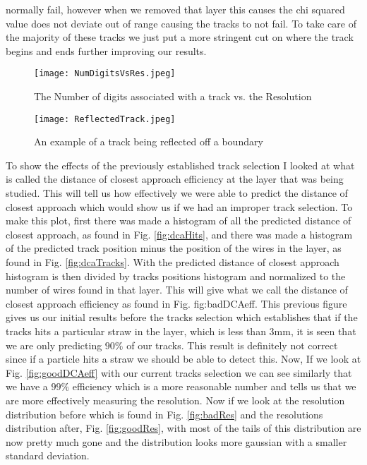\documentclass[./Thesis]{subfiles}
\begin{document}
normally fail, however when we removed that layer this causes the chi squared value does not deviate out of range causing the tracks to not fail. To take care of the majority of these tracks we just put a more stringent cut on where the track begins and ends further improving our results.
	
\begin{figure}
	\centerline{\texttt{[image: NumDigitsVsRes.jpeg]}}
	\caption[Number of Digits vs. Resolution]{ The Number of digits associated with a track vs. the Resolution}
	\label{fig:NumDigits}
\end{figure} 

\begin{figure}
	\centerline{\texttt{[image: ReflectedTrack.jpeg]}}
	\caption[Reflected Track]{ An example of a track being reflected off a boundary}
	\label{fig:RefTrack}
\end{figure} 

	 
	 
	 To show the effects of the previously established track selection I looked at what is called the distance of closest approach efficiency at the layer that was being studied. This will tell us how effectively we were able to predict the distance of closest approach which would show us if we had an improper track selection. To make this plot, first there was made a histogram of all the predicted distance of closest approach, as found in Fig. \ref{fig:dcaHits}, and there was made a histogram of the predicted track position minus the position of the wires in the layer, as found in Fig. \ref{fig:dcaTracks}. With the predicted distance of closest approach histogram is then divided by tracks positions histogram and normalized to the number of wires found in that layer. This will give what we call the distance of closest approach efficiency as found in Fig. {fig:badDCAeff}. This previous figure gives us our initial results before the tracks selection which establishes that if the tracks hits a particular straw in the layer, which is less than 3mm, it is seen that we are only predicting $90\%$  of our tracks. This result is definitely not correct since if a particle hits a straw we should be able to detect this. Now, If we look at Fig. \ref{fig:goodDCAeff} with our current tracks selection we can see similarly that we have a $99\%$ efficiency which is a more reasonable number and tells us that we are more effectively measuring the resolution. Now if we look at the resolution distribution before which is found in Fig. \ref{fig:badRes} and the resolutions distribution after, Fig. \ref{fig:goodRes}, with most of the tails of this distribution are now pretty much gone and the distribution looks more gaussian with a smaller standard deviation.
\end{document}
